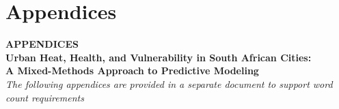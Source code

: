 \documentclass[12pt,a4paper]{article}
\begin{document}
\newpage
\pagestyle{empty} %
\tableofcontents
\newpage

\pagestyle{empty} %

\clearpage

\setcounter{page}{1}
\pagestyle{plain} %

\makeatletter
\def\ps@plain{
  \let\@oddhead\@empty
  \def\@oddfoot{\reset@font\hfil\thepage\hfil}
  \let\@evenhead\@empty
  \def\@evenfoot{\reset@font\hfil\thepage\hfil}
}
\makeatother

\pagestyle{plain}














\clearpage
\pagestyle{empty}
\makeatletter
\def\@oddfoot{}
\def\@evenfoot{}
\makeatother


\newpage
\section*{Appendices}
\begin{center}
\Large\textbf{APPENDICES}\\[0.5em]
\large\textbf{Urban Heat, Health, and Vulnerability in South African Cities:}\\[0.2em]
\large\textbf{A Mixed-Methods Approach to Predictive Modeling}\\[0.5em]
\normalsize\textit{The following appendices are provided in a separate document to support word count requirements}\\[1em]
\end{center}
\end{document}
